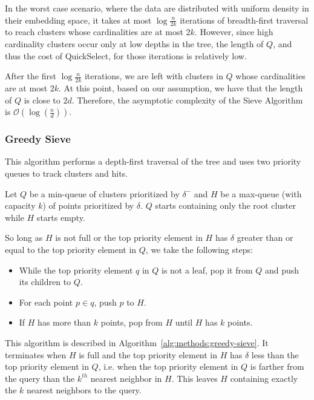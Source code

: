 In the worst case scenario, where the data are distributed with uniform density in their embedding space, it takes at most $\log{\frac{n}{2k}}$ iterations of breadth-first traversal to reach clusters whose cardinalities are at most $2k$.
However, since high cardinality clusters occur only at low depths in the tree, the length of $Q$, and thus the cost of QuickSelect, for those iterations is relatively low.

After the first $\log{\frac{n}{2k}}$ iterations, we are left with clusters in $Q$ whose cardinalities are at most $2k$.
At this point, based on our assumption, we have that the length of $Q$ is close to $2d$.
Therefore, the asymptotic complexity of the Sieve Algorithm is $\mathcal{O} \left( \log(\frac{n}{d}) \right)$.


\subsubsection{Greedy Sieve}
\label{subsubsec:methods:knn:greedy-sieve}

This algorithm performs a depth-first traversal of the tree and uses two priority queues to track clusters and hits.

Let $Q$ be a min-queue of clusters prioritized by $\delta^{-}$ and $H$ be a max-queue (with capacity $k$) of points prioritized by $\delta$.
$Q$ starts containing only the root cluster while $H$ starts empty.

So long as $H$ is not full or the top priority element in $H$ has $\delta$ greater than or equal to the top priority element in $Q$, we take the following steps:

\begin{itemize}
    \item While the top priority element $q$ in $Q$ is not a leaf, pop it from $Q$ and push its children to $Q$.
    \item For each point $p \in q$, push $p$ to $H$.
    \item If $H$ has more than $k$ points, pop from $H$ until $H$ has $k$ points.
\end{itemize}

This algorithm is described in Algorithm~\ref{alg:methods:greedy-sieve}.
It terminates when $H$ is full and the top priority element in $H$ has $\delta$ less than the top priority element in $Q$, i.e. when the top priority element in $Q$ is farther from the query than the $k^{th}$ nearest neighbor in $H$.
This leaves $H$ containing exactly the $k$ nearest neighbors to the query.


